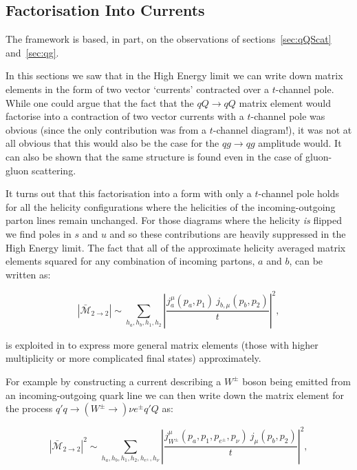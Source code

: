 	\subsection{Factorisation Into Currents}
	\label{sec:currents}

		The \hej framework is based, in part, on the observations of sections~\eqref{sec:qQScat}
		and~\eqref{sec:qg}.

		In this sections we saw that in the High Energy limit we can write down matrix elements in the
		form of two vector `currents' contracted over a $t$-channel pole.  While one could argue that
		the fact that the $qQ\to qQ$ matrix element would factorise into a contraction of two vector
		currents with a $t$-channel pole was obvious (since the only contribution was from a $t$-channel
		diagram!), it was not at all obvious that this would also be the case for the $qg\to qg$
		amplitude would.  It can also be shown that the same structure is found even in the case of
		gluon-gluon scattering\cite{Andersen:2011hs}.

		It turns out that this factorisation into a form with only a $t$-channel pole holds for
		all the helicity configurations where the helicities of the incoming-outgoing parton lines
		remain unchanged.  For those diagrams where the helicity \emph{is} flipped we find poles
		in $s$ and $u$ and so these contributions are heavily suppressed in the High Energy limit.
		The fact that all of the approximate helicity averaged matrix elements squared for any
		combination of incoming partons, $a$ and $b$, can be written as:

		\begin{equation}
			|\bar{\mathcal{M}}_{2\to2}| \sim \sum_{h_a, h_b, h_1, h_2}
			\left|\frac{j^\mu_a(p_a, p_1)\ j_{b, \mu}(p_b, p_2)}{t}\right|^2,
		\end{equation}

		is exploited in \hej to express more general matrix elements (those with higher multiplicity or
		more complicated final states) approximately.

		For example by constructing a current describing a $W^\pm$ boson being emitted from an
		incoming-outgoing quark line we can then write down the matrix element for the process
		$q'q\to(W^\pm\to)\nu e^\pm q'Q$ as:

		\begin{equation}
			|\bar{\mathcal{M}}_{2\to2}|^2 \sim \sum_{h_a, h_b, h_1, h_2, h_{e^\pm}, h_\nu}
			\left|\frac{j^\mu_{W^\pm}(p_a, p_1, p_{e^\pm}, p_\nu)\ j_\mu(p_b, p_2)}{t}\right|^2,
			\label{eqn:wExample}
		\end{equation}

